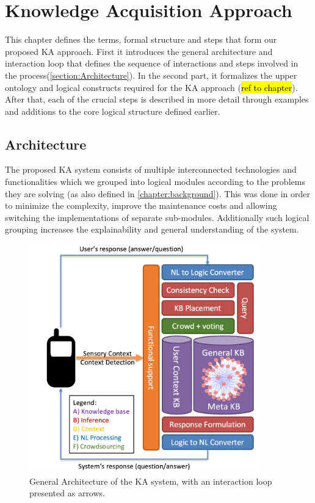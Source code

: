 % 
\chapter{Knowledge Acquisition Approach}

This chapter defines the terms, formal structure and steps that form our 
proposed KA approach. First it introduces the general architecture and 
interaction loop that defines the sequence of interactions and steps
involved in the process(\autoref{section:Architecture}). In the second part, it formalizes 
the upper ontology and logical constructs required for the KA approach 
(\hl{ref to chapter}). After that, each of the crucial steps is described in 
more detail through examples and additions to the core logical structure 
defined earlier.

\section{Architecture}
\label{section:Architecture}
The proposed KA system consists of multiple interconnected technologies and 
functionalities which we grouped into logical modules according to
the problems they are solving (as also defined in \autoref{chapter:background}). 
This was done in order to minimize the complexity, improve the maintenance 
costs and allowing switching the implementations of separate sub-modules. 
Additionally such logical grouping increases the explainability and general
understanding of the system.

\begin{figure}[htb]
	\centering
		\includegraphics[width=0.9\textwidth]{figures/architecture.png}
	\caption{General Architecture of the KA system, with an interaction loop
			 presented as arrows.}
	\label{fig:Architecture}
\end{figure}


